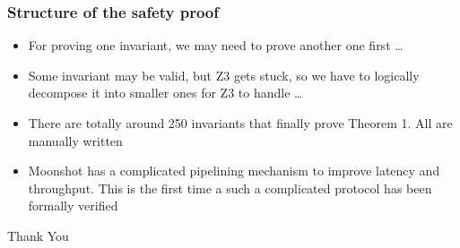 \documentclass{beamer}
\begin{document}
\begin{frame}
    \frametitle{Structure of the safety proof}
    \begin{itemize}
        \item For proving one invariant, we may need to prove another
            one first \dots
            \pause
            \vfill
        \item Some invariant may be valid, but Z3 gets stuck, so we
            have to logically decompose it into smaller ones for Z3 to
            handle \dots
            \pause
            \vfill
        \item There are totally around 250 invariants that finally
            prove Theorem 1. All are manually written
            \pause
            \vfill
        \item Moonshot has a complicated pipelining mechanism to
            improve latency and throughput. This is the first time a
            such a complicated protocol has been formally verified
    \end{itemize}
    \pause
    \vfill
    \begin{center}
        \Large{Thank You}
    \end{center}
\end{frame}
\end{document}
